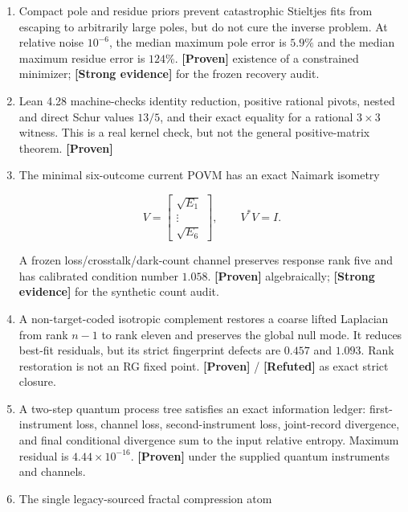 \documentclass[11pt,a4paper,openany]{report}
\newcommand{\statusProven}{\textcolor{fingreen}{[Proven]}}
\newcommand{\statusStrong}{\textcolor{finblue}{[Strong evidence]}}
\newcommand{\statusRefuted}{\textcolor{finred}{[Refuted]}}
\begin{document}
\begin{enumerate}
\item 
Compact pole and residue priors prevent catastrophic Stieltjes fits from escaping to arbitrarily large poles, but do not cure the inverse problem. At relative noise \(10^{-6}\), the median maximum pole error is \(5.9\%\) and the median maximum residue error is \(124\%\). \textbf{\statusProven{}} existence of a constrained minimizer; \textbf{\statusStrong{}} for the frozen recovery audit.

\item 
Lean 4.28 machine-checks identity reduction, positive rational pivots, nested and direct Schur values \(13/5\), and their exact equality for a rational \(3\times3\) witness. This is a real kernel check, but not the general positive-matrix theorem. \textbf{\statusProven{}}

\item 
The minimal six-outcome current POVM has an exact Naimark isometry

\[
   V=\begin{bmatrix}\sqrt{E_1}\\ \vdots\\ \sqrt{E_6}\end{bmatrix},
   \qquad V^\ast V=I.
   \]

A frozen loss/\allowbreak{}crosstalk/\allowbreak{}dark-count channel preserves response rank five and has calibrated condition number \(1.058\). \textbf{\statusProven{}} algebraically; \textbf{\statusStrong{}} for the synthetic count audit.

\item 
A non-target-coded isotropic complement restores a coarse lifted Laplacian from rank \(n-1\) to rank eleven and preserves the global null mode. It reduces best-fit residuals, but its strict fingerprint defects are \(0.457\) and \(1.093\). Rank restoration is not an RG fixed point. \textbf{\statusProven{}} /\allowbreak{} \textbf{\statusRefuted{}} as exact strict closure.

\item 
A two-step quantum process tree satisfies an exact information ledger: first-instrument loss, channel loss, second-instrument loss, joint-record divergence, and final conditional divergence sum to the input relative entropy. Maximum residual is \(4.44\times10^{-16}\). \textbf{\statusProven{}} under the supplied quantum instruments and channels.

\item 
The single legacy-sourced fractal compression atom


\end{enumerate}
\end{document}
